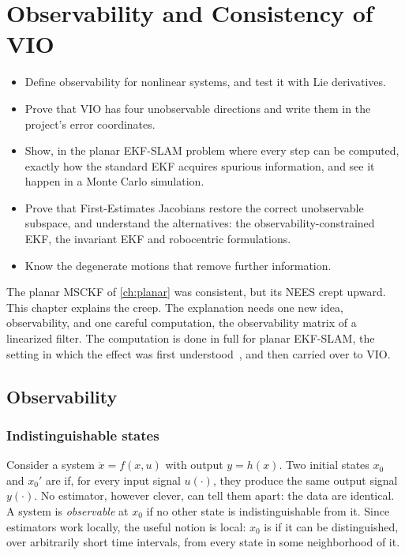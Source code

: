 \chapter{Observability and Consistency of VIO}
\label{ch:observability}

\begin{objectives}
\begin{itemize}
  \item Define observability for nonlinear systems, and test it with Lie derivatives.
  \item Prove that VIO has four unobservable directions and write them in the project's error coordinates.
  \item Show, in the planar EKF-SLAM problem where every step can be computed, exactly how the standard EKF acquires spurious information,
        and see it happen in a Monte Carlo simulation.
  \item Prove that First-Estimates Jacobians restore the correct unobservable subspace, and understand the alternatives: the
        observability-constrained EKF, the invariant EKF and robocentric formulations.
  \item Know the degenerate motions that remove further information.
\end{itemize}
\end{objectives}

The planar MSCKF of \cref{ch:planar} was consistent, but its NEES crept upward. This chapter explains the creep. The explanation needs one
new idea, observability, and one careful computation, the observability matrix of a linearized filter. The computation is done in full for
planar EKF-SLAM, the setting in which the effect was first understood~\cite{julier2001counter, bailey2006consistency, huang2010observability},
and then carried over to VIO.

\section{Observability}

\subsection{Indistinguishable states}

Consider a system $\dot x = f(x, u)$ with output $y = h(x)$. Two initial states $x_0$ and $x_0'$ are  if, for every input
signal $u(\cdot)$, they produce the same output signal $y(\cdot)$. No estimator, however clever, can tell them apart: the data are identical. A
system is \emph{observable} at $x_0$ if no other state is indistinguishable from it. Since estimators work locally, the useful notion is
local: $x_0$ is  if it can be distinguished, over arbitrarily short time intervals, from
every state in some neighborhood of it.

